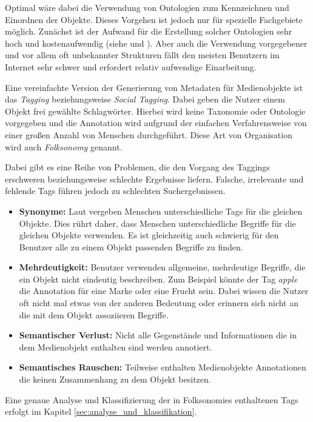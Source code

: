 Optimal wäre dabei die Verwendung von Ontologien zum Kennzeichnen und Einordnen der Objekte. Dieses Vorgehen ist jedoch nur für spezielle Fachgebiete möglich. Zunächst ist der Aufwand für die Erstellung solcher Ontologien sehr hoch und kostenaufwendig (siehe \cite{ontology_expensive1} und \cite{ontology_expensive2}). Aber auch die Verwendung vorgegebener und vor allem oft unbekannter Strukturen fällt den meisten Benutzern im Internet sehr schwer und erfordert relativ aufwendige Einarbeitung.

Eine vereinfachte Version der Generierung von Metadaten für Medienobjekte ist das \emph{Tagging} beziehungsweise \emph{Social Tagging}. Dabei geben die Nutzer einem Objekt frei gewählte Schlagwörter. Hierbei wird keine Taxonomie oder Ontologie vorgegeben und die Annotation wird aufgrund der einfachen Verfahrensweise von einer großen Anzahl von Menschen durchgeführt. Diese Art von Organisation wird auch \emph{Folksonomy} genannt.

Dabei gibt es eine Reihe von Problemen, die den Vorgang des Taggings erschweren beziehungsweise schlechte Ergebnisse liefern. Falsche, irrelevante und fehlende Tags führen jedoch zu schlechten Suchergebnissen.

\begin{itemize}
  \item \textbf{Synonyme:} Laut \cite{learningToTag} vergeben Menschen unterschiedliche Tags für die gleichen Objekte. Dies rührt daher, dass Menschen unterschiedliche Begriffe für die gleichen Objekte verwenden. Es ist gleichzeitig auch schwierig für den Benutzer alle zu einem Objekt passenden Begriffe zu finden.
  \item \textbf{Mehrdeutigkeit:} Benutzer verwenden allgemeine, mehrdeutige Begriffe, die ein Objekt nicht eindeutig beschreiben. Zum Beispiel könnte der Tag \emph{apple} die Annotation für eine Marke oder eine Frucht sein. Dabei wissen die Nutzer oft nicht mal etwas von der anderen Bedeutung oder erinnern sich nicht an die mit dem Objekt assoziieren Begriffe.
  \item \textbf{Semantischer Verlust:} Nicht alle Gegenstände und Informationen die in dem Medienobjekt enthalten sind werden annotiert.
  \item \textbf{Semantisches Rauschen:} Teilweise enthalten Medienobjekte Annotationen die keinen Zusammenhang zu dem Objekt besitzen.
\end{itemize}


Eine genaue Analyse und Klassifizierung der in Folksonomies enthaltenen Tags erfolgt im Kapitel \ref{sec:analyse_und_klassifikation}.

